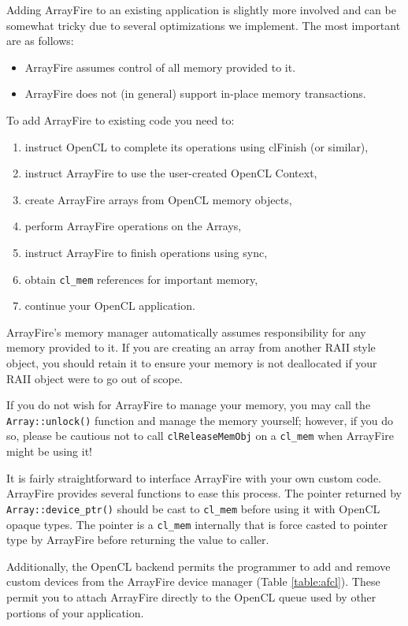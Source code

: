 Adding ArrayFire to an existing application is slightly more involved and can be somewhat tricky due to several optimizations we implement. The most important are as follows:

\begin{itemize}
\item ArrayFire assumes control of all memory provided to it.
\item ArrayFire does not (in general) support in-place memory transactions.
\end{itemize}

To add ArrayFire to existing code you need to:

\begin{enumerate}
\item instruct OpenCL to complete its operations using clFinish (or similar),
\item instruct ArrayFire to use the user-created OpenCL Context,
\item create ArrayFire arrays from OpenCL memory objects,
\item perform ArrayFire operations on the Arrays,
\item instruct ArrayFire to finish operations using sync,
\item obtain \texttt{cl_mem} references for important memory,
\item continue your OpenCL application.
\end{enumerate}
	
ArrayFire's memory manager automatically assumes responsibility for any memory provided to it. If you are creating an array from another RAII style object, you should retain it to ensure your memory is not deallocated if your RAII object were to go out of scope.

If you do not wish for ArrayFire to manage your memory, you may call the \texttt{Array::unlock()} function and manage the memory yourself; however, if you do so, please be cautious not to call \texttt{clReleaseMemObj} on a \texttt{cl_mem} when ArrayFire might be using it!

It is fairly straightforward to interface ArrayFire with your own custom code. ArrayFire provides several functions to ease this process. The pointer returned by \texttt{Array::device_ptr()} should be cast to \texttt{cl_mem} before using it with OpenCL opaque types. The pointer is a \texttt{cl_mem} internally that is force casted to pointer type by ArrayFire before returning the value to caller.

Additionally, the OpenCL backend permits the programmer to add and remove custom devices from the ArrayFire device manager (Table \ref{table:afcl}). These permit you to attach ArrayFire directly to the OpenCL queue used by other portions of your application.

